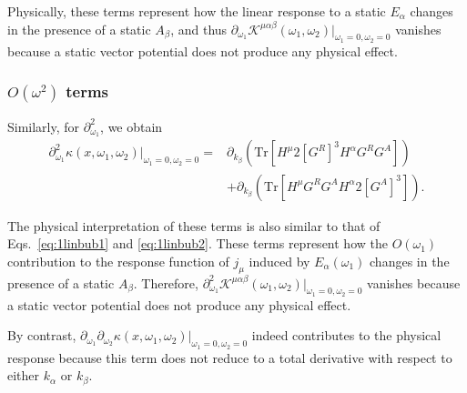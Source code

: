 \documentclass[twocolumn,superscriptaddress]{revtex4-1}
\begin{document}
Physically, these terms represent how the linear response to a static $E_\alpha$ changes in the presence of a static $A_\beta$, and thus $\partial_{\omega_{1}}\mathcal{K}^{\mu\alpha\beta}(\omega_1,\omega_2)|_{\omega_1=0,\omega_2=0}$ vanishes because a static vector potential does not produce any physical effect.

\subsubsection{$O(\omega^2)$ terms}
Similarly, for $\partial_{\omega_1}^2$, we obtain
\begin{align}
  \partial_{\omega_1}^2\kappa (x,\omega_1,\omega_2)|_{\omega_1=0,\omega_2=0}
  =&\partial_{k_\beta} (\mathrm{Tr}[H^{\mu} 2[G^R]^3 H^{\alpha} G^R G^A]) \label{eq:2linbub1} \\
  &+\partial_{k_\beta} (\mathrm{Tr}[H^{\mu}G^R G^A H^{\alpha} 2[G^A]^3]) \label{eq:2linbub2}.
\end{align}

The physical interpretation of these terms is also similar to that of Eqs.~\eqref{eq:1linbub1} and \eqref{eq:1linbub2}.
These terms represent how the $O(\omega_1)$ contribution to the response function of $j_\mu$ induced by $E_\alpha(\omega_1)$ changes in the presence of a static $A_\beta$.
Therefore, $\partial_{\omega_{1}}^2\mathcal{K}^{\mu\alpha\beta}(\omega_1,\omega_2)|_{\omega_1=0,\omega_2=0}$ vanishes because a static vector potential does not produce any physical effect.

By contrast, $\partial_{\omega_1}\partial_{\omega_2}\kappa (x,\omega_1,\omega_2)|_{\omega_1=0,\omega_2=0}$ indeed contributes to the physical response because this term does not reduce to a total derivative with respect to either $k_\alpha$ or $k_\beta$.
\end{document}
